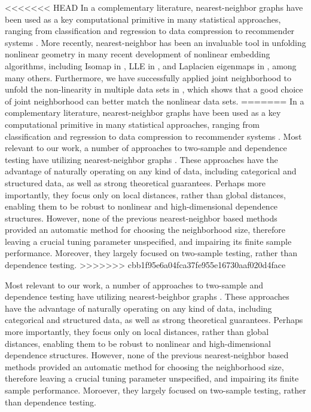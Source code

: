\documentclass[11pt]{article}
\begin{document}
<<<<<<< HEAD
In a complementary literature, nearest-neighbor graphs have been used as a key computational primitive in many statistical approaches, ranging from classification and regression \cite{Stone1970} to data compression to recommender systems \cite{Sarwar2000}. 
More recently, nearest-neighbor has been an invaluable tool in unfolding nonlinear geometry in many recent development of nonlinear embedding algorithms, including Isomap in \cite{TenenbaumSilvaLangford2000, SilvaTenenbaum2003}, LLE in \cite{SaulRoweis2000, RoweisSaul2003}, and Laplacien eigenmaps in \cite{BelkinNiyogi2003}, among many others. Furthermore, we have successfully applied joint neighborhood to unfold the non-linearity in multiple data sets in \cite{ShenVogelsteinPriebe2015}, which shows that a good choice of joint neighborhood can better match the nonlinear data sets. 
=======
In a complementary literature, nearest-neighbor graphs have been used as a key computational primitive in many statistical approaches, ranging from classification and regression \cite{Stone1970} to data compression to recommender systems \cite{Sarwar2000}. Most relevant to our work, a number of approaches to two-sample and dependence testing have utilizing nearest-neighbor graphs \cite{David1966,Friedman1983,Schilling1986,Dumcke2014}.  These approaches have the advantage of naturally operating on any kind of data, including categorical and structured data, as well as strong theoretical guarantees.  Perhaps more importantly, they focus only on local distances, rather than global distances, enabling them to be robust to nonlinear and high-dimensional dependence structures.  However, none of the previous nearest-neighbor based methods provided an automatic method for choosing the neighborhood size, therefore leaving a crucial tuning parameter unspecified, and impairing its finite sample performance. Moreover, they largely focused on two-sample testing, rather than dependence testing.  
>>>>>>> cbb1f95e6a04fca37fe955e16730aaf020d4face


Most relevant to our work, a number of approaches to two-sample and dependence testing have utilizing nearest-beighbor graphs \cite{David1966,Friedman1983,Schilling1986,Dumcke2014}.  These approaches have the advantage of naturally operating on any kind of data, including categorical and structured data, as well as strong theoretical guarantees.  Perhaps more importantly, they focus only on local distances, rather than global distances, enabling them to be robust to nonlinear and high-dimensional dependence structures.  However, none of the previous nearest-neighbor based methods provided an automatic method for choosing the neighborhood size, therefore leaving a crucial tuning parameter unspecified, and impairing its finite sample performance. Moroever, they largely focused on two-sample testing, rather than dependence testing.  
\end{document}
